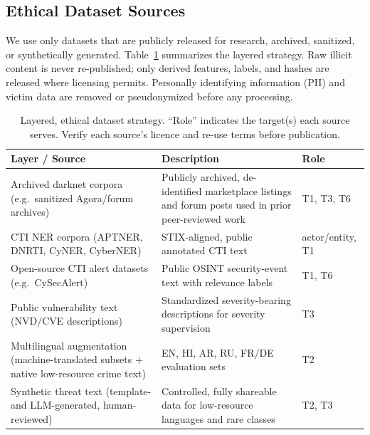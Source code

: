 \documentclass[11pt,a4paper]{article}
\begin{document}
\subsection{Ethical Dataset Sources}\label{sec:method-ethics}
We use only datasets that are publicly released for research, archived, sanitized, or
synthetically generated. Table~\ref{tab:data} summarizes the layered strategy. Raw
illicit content is never re-published; only derived features, labels, and hashes are
released where licensing permits. Personally identifying information (PII) and victim
data are removed or pseudonymized before any processing.

\begin{table}[t]
\centering
\caption{Layered, ethical dataset strategy. ``Role'' indicates the target(s) each source
serves. Verify each source's licence and re-use terms before publication.}
\label{tab:data}
\small
\renewcommand{\arraystretch}{1.15}
\begin{tabular}{@{}p{3.4cm}p{5.7cm}p{2.6cm}@{}}
\toprule
\textbf{Layer / Source} & \textbf{Description} & \textbf{Role} \\
\midrule
Archived darknet corpora (e.g.\ sanitized Agora/forum archives)~\cite{sangher2023towards}
  & Publicly archived, de-identified marketplace listings and forum posts used in prior
    peer-reviewed work & T1, T3, T6 \\
CTI NER corpora (APTNER, DNRTI, CyNER, CyberNER)~\cite{wang2022aptner,evangelatos2021ner,echchammakhy2025cyberner,feng2025promptbart}
  & STIX-aligned, public annotated CTI text & actor/entity, T1 \\
Open-source CTI alert datasets (e.g.\ CySecAlert)~\cite{riebe2021cysecalert}
  & Public OSINT security-event text with relevance labels & T1, T6 \\
Public vulnerability text (NVD/CVE descriptions)
  & Standardized severity-bearing descriptions for severity supervision & T3 \\
Multilingual augmentation (machine-translated subsets $+$ native low-resource crime
  text)~\cite{alharbi2025bert,nazir2025multilingual}
  & EN, HI, AR, RU, FR/DE evaluation sets & T2 \\
Synthetic threat text (template- and LLM-generated, human-reviewed)
  & Controlled, fully shareable data for low-resource languages and rare classes & T2, T3 \\
\bottomrule
\end{tabular}
\end{table}
\end{document}
